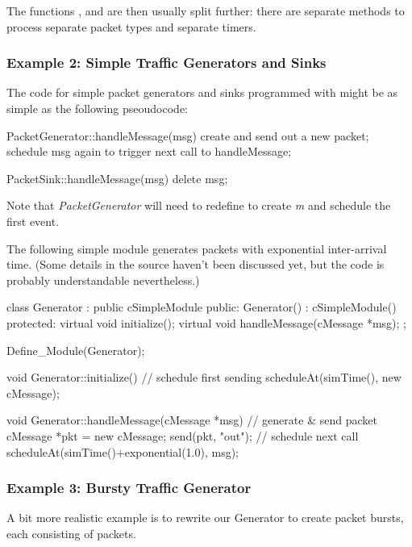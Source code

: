 The functions , 
and  are then usually split further: there are separate
methods to process separate packet types and separate timers.


\subsubsection{Example 2: Simple Traffic Generators and Sinks}


The code for simple packet generators and sinks programmed with  might
be as simple as the following pseoudocode:

\begin{cpp}
PacketGenerator::handleMessage(msg)
{
    create and send out a new packet;
    schedule msg again to trigger next call to handleMessage;
}

PacketSink::handleMessage(msg)
{
    delete msg;
}
\end{cpp}

Note that \textit{PacketGenerator} will need to redefine 
to create \textit{m} and schedule the first event.

The following simple module generates packets with exponential
inter-arrival time. (Some details in the source haven't been
discussed yet, but the code is probably understandable nevertheless.)


\begin{cpp}
class Generator : public cSimpleModule
{
  public:
    Generator() : cSimpleModule() {}
  protected:
    virtual void initialize();
    virtual void handleMessage(cMessage *msg);
};

Define_Module(Generator);

void Generator::initialize()
{
    // schedule first sending
    scheduleAt(simTime(), new cMessage);
}

void Generator::handleMessage(cMessage *msg)
{
    // generate & send packet
    cMessage *pkt = new cMessage;
    send(pkt, "out");
    // schedule next call
    scheduleAt(simTime()+exponential(1.0), msg);
}
\end{cpp}



\subsubsection{Example 3: Bursty Traffic Generator}


A bit more realistic example is to rewrite our Generator to create
packet bursts, each consisting of  packets.

